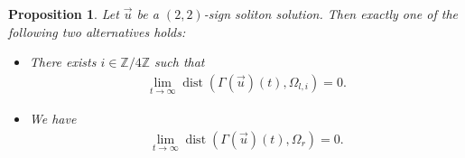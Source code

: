 \documentclass[reqno]{amsart}
\theoremstyle{plain}
\newtheorem{proposition}[theorem]{Proposition}
\theoremstyle{definition}
\numberwithin{equation}{section}
\begin{document}
\begin{proposition}\label{2,2fullconv1}
Let $\vec{u}$ be a $(2,2)$-sign soliton solution. Then exactly one of the following two alternatives holds:
\begin{itemize}
\item There exists $i\in \mathbb{Z}/4\mathbb{Z}$ such that 
\begin{align}\label{shuugoukyoku1}
\lim_{t\to\infty}\operatorname{dist}(\Gamma(\vec{u})(t),\Omega_{l,i})=0.
\end{align}

\item We have
\begin{align}\label{shuugoukyoku2}
\lim_{t\to\infty}\operatorname{dist}(\Gamma(\vec{u})(t),\Omega_r)=0.
\end{align}
\end{itemize}
\end{proposition}
\end{document}
